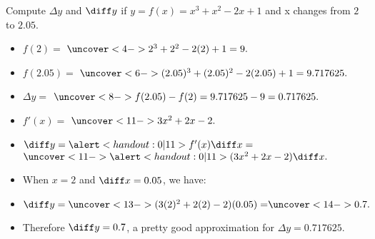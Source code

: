 \begin{frame}
\begin{example}[Example 3, p. 192]
Compute $\Delta y$ and $\diff y$ if $y = f(x) = x^3 + x^2 - 2x + 1$ and x changes from $2$ to $2.05$.
\begin{itemize}
\item<2-| alert@3-4>  $f(2) =$ $\uncover<4->{2^3+2^2-2(2)+1 = 9.}$
\item<2-| alert@5-6>  $f(2.05) =$ $\uncover<6->{(2.05)^3+(2.05)^2-2(2.05)+1 = 9.717625.}$
\item<2-| alert@7-8>  $\Delta y =$ $\uncover<8->{f(2.05) - f(2) = 9.717625 - 9 = 0.717625.}$
\item<9-| alert@10-11>  $f'(x) = $ $\uncover<11->{3x^2 + 2x -2.}$
\item<9->  $\diff y = \alert<handout:0| 11>{f'(x)}\diff x = $ $\uncover<11->{\alert<handout:0| 11>{(3x^2+2x-2)}\diff x.}$
\item<12->  When $x = 2$ and $\diff x = 0.05$, we have:
\item<12-| alert@13-14>  $\diff y = \uncover<13->{(3(2)^2 + 2(2) - 2)(0.05) =} \uncover<14->{0.7.}$
\item<15->  Therefore $\diff y = 0.7$, a pretty good approximation for $\Delta y = 0.717625$.
\end{itemize}
\end{example}
\end{frame}
